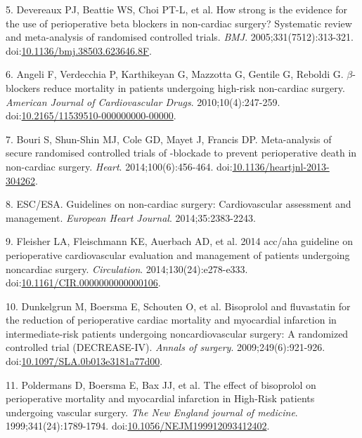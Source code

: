 \documentclass[]{article}
\begin{document}
\hypertarget{ref-Devereaux313}{}
5. Devereaux PJ, Beattie WS, Choi PT-L, et al. How strong is the
evidence for the use of perioperative beta blockers in non-cardiac
surgery? Systematic review and meta-analysis of randomised controlled
trials. \emph{BMJ}. 2005;331(7512):313-321.
doi:\href{https://doi.org/10.1136/bmj.38503.623646.8F}{10.1136/bmj.38503.623646.8F}.

\hypertarget{ref-Angeli2010}{}
6. Angeli F, Verdecchia P, Karthikeyan G, Mazzotta G, Gentile G, Reboldi
G. \(\beta\)-blockers reduce mortality in patients undergoing high-risk
non-cardiac surgery. \emph{American Journal of Cardiovascular Drugs}.
2010;10(4):247-259.
doi:\href{https://doi.org/10.2165/11539510-000000000-00000}{10.2165/11539510-000000000-00000}.

\hypertarget{ref-bouri2014}{}
7. Bouri S, Shun-Shin MJ, Cole GD, Mayet J, Francis DP. Meta-analysis of
secure randomised controlled trials of -blockade to prevent
perioperative death in non-cardiac surgery. \emph{Heart}.
2014;100(6):456-464.
doi:\href{https://doi.org/10.1136/heartjnl-2013-304262}{10.1136/heartjnl-2013-304262}.

\hypertarget{ref-esc2014}{}
8. ESC/ESA. Guidelines on non-cardiac surgery: Cardiovascular assessment
and management. \emph{European Heart Journal}. 2014;35:2383-2243.

\hypertarget{ref-Fleishere278}{}
9. Fleisher LA, Fleischmann KE, Auerbach AD, et al. 2014 acc/aha
guideline on perioperative cardiovascular evaluation and management of
patients undergoing noncardiac surgery. \emph{Circulation}.
2014;130(24):e278-e333.
doi:\href{https://doi.org/10.1161/CIR.0000000000000106}{10.1161/CIR.0000000000000106}.

\hypertarget{ref-dunkelgrun2009}{}
10. Dunkelgrun M, Boersma E, Schouten O, et al. Bisoprolol and
fluvastatin for the reduction of perioperative cardiac mortality and
myocardial infarction in intermediate-risk patients undergoing
noncardiovascular surgery: A randomized controlled trial (DECREASE-IV).
\emph{Annals of surgery}. 2009;249(6):921-926.
doi:\href{https://doi.org/10.1097/SLA.0b013e3181a77d00}{10.1097/SLA.0b013e3181a77d00}.

\hypertarget{ref-poldermans1999}{}
11. Poldermans D, Boersma E, Bax JJ, et al. The effect of bisoprolol on
perioperative mortality and myocardial infarction in High-Risk patients
undergoing vascular surgery. \emph{The New England journal of medicine}.
1999;341(24):1789-1794.
doi:\href{https://doi.org/10.1056/NEJM199912093412402}{10.1056/NEJM199912093412402}.
\end{document}
